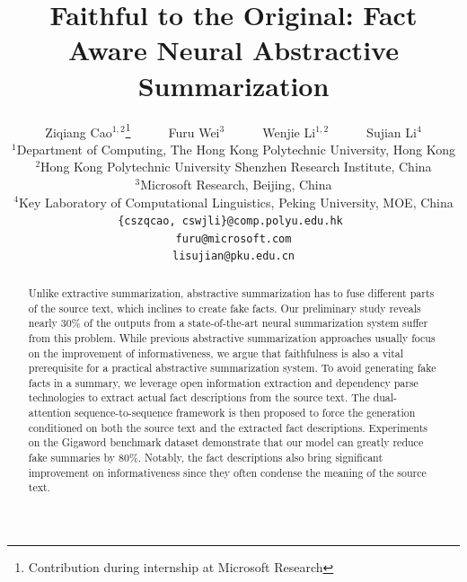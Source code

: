 \documentclass[letterpaper]{article} %
\begin{document}
	\title{Faithful to the Original: Fact Aware Neural Abstractive Summarization}
	\author{
			Ziqiang Cao$^{1,2}$\thanks{Contribution during internship at Microsoft Research}   ~~ ~~ Furu Wei$^3$ ~~ ~~ Wenjie Li$^{1,2}$ ~~ ~~ Sujian Li$^4$\\
		$^1$Department of Computing, The Hong Kong Polytechnic University, Hong Kong\\
		$^2$Hong Kong Polytechnic University Shenzhen Research Institute, China \\
		$^3$Microsoft Research, Beijing, China\\
		$^4$Key Laboratory of Computational Linguistics, Peking University, MOE, China \\
		{\tt \{cszqcao, cswjli\}@comp.polyu.edu.hk  } \\
		{\tt furu@microsoft.com} \\
		{\tt lisujian@pku.edu.cn} \\
	}
	\maketitle
	\begin{abstract}
		Unlike extractive summarization, abstractive summarization has to fuse different parts of the source text, which inclines to create fake facts.
		Our preliminary study reveals nearly 30\% of the outputs from a state-of-the-art neural summarization system suffer from this problem.
		While previous abstractive summarization approaches usually focus on the improvement of informativeness, we argue that faithfulness is also a vital prerequisite for a practical abstractive summarization system.
		To avoid generating fake facts in a summary, we leverage open information extraction and dependency parse technologies to extract actual fact descriptions from the source text.
		The dual-attention sequence-to-sequence framework is then proposed to force the generation conditioned on both the source text and the extracted fact descriptions.
		Experiments on the Gigaword benchmark dataset demonstrate that our model can greatly reduce fake summaries by 80\%.
		Notably, the fact descriptions also bring significant improvement on informativeness since they often condense the meaning of the source text.
	\end{abstract}
	
\end{document}
